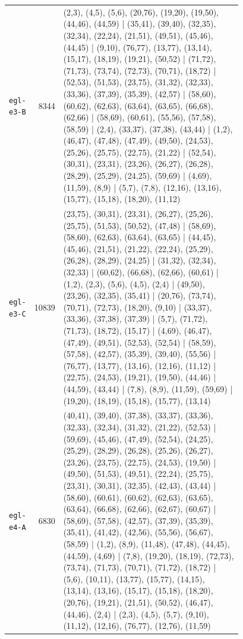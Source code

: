 \begin{landscape}
\begin{longtable}{lr>{\tiny\raggedright\arraybackslash}p{0.78\linewidth}}
\texttt{egl-e3-B} & 8344 & (2,3), (4,5), (5,6), (20,76), (19,20), (19,50), (44,46), (44,59) | (35,41), (39,40), (32,35), (32,34), (22,24), (21,51), (49,51), (45,46), (44,45) | (9,10), (76,77), (13,77), (13,14), (15,17), (18,19), (19,21), (50,52) | (71,72), (71,73), (73,74), (72,73), (70,71), (18,72) | (52,53), (51,53), (23,75), (31,32), (32,33), (33,36), (37,39), (35,39), (42,57) | (58,60), (60,62), (62,63), (63,64), (63,65), (66,68), (62,66) | (58,69), (60,61), (55,56), (57,58), (58,59) | (2,4), (33,37), (37,38), (43,44) | (1,2), (46,47), (47,48), (47,49), (49,50), (24,53), (25,26), (25,75), (22,75), (21,22) | (52,54), (30,31), (23,31), (23,26), (26,27), (26,28), (28,29), (25,29), (24,25), (59,69) | (4,69), (11,59), (8,9) | (5,7), (7,8), (12,16), (13,16), (15,77), (15,18), (18,20), (11,12) \\[2pt]
\texttt{egl-e3-C} & 10839 & (23,75), (30,31), (23,31), (26,27), (25,26), (25,75), (51,53), (50,52), (47,48) | (58,69), (58,60), (62,63), (63,64), (63,65) | (44,45), (45,46), (21,51), (21,22), (22,24), (25,29), (26,28), (28,29), (24,25) | (31,32), (32,34), (32,33) | (60,62), (66,68), (62,66), (60,61) | (1,2), (2,3), (5,6), (4,5), (2,4) | (49,50), (23,26), (32,35), (35,41) | (20,76), (73,74), (70,71), (72,73), (18,20), (9,10) | (33,37), (33,36), (37,38), (37,39) | (5,7), (71,72), (71,73), (18,72), (15,17) | (4,69), (46,47), (47,49), (49,51), (52,53), (52,54) | (58,59), (57,58), (42,57), (35,39), (39,40), (55,56) | (76,77), (13,77), (13,16), (12,16), (11,12) | (22,75), (24,53), (19,21), (19,50), (44,46) | (44,59), (43,44) | (7,8), (8,9), (11,59), (59,69) | (19,20), (18,19), (15,18), (15,77), (13,14) \\[2pt]
\texttt{egl-e4-A} & 6830 & (40,41), (39,40), (37,38), (33,37), (33,36), (32,33), (32,34), (31,32), (21,22), (52,53) | (59,69), (45,46), (47,49), (52,54), (24,25), (25,29), (28,29), (26,28), (25,26), (26,27), (23,26), (23,75), (22,75), (24,53), (19,50) | (49,50), (51,53), (49,51), (22,24), (25,75), (23,31), (30,31), (32,35), (42,43), (43,44) | (58,60), (60,61), (60,62), (62,63), (63,65), (63,64), (66,68), (62,66), (62,67), (60,67) | (58,69), (57,58), (42,57), (37,39), (35,39), (35,41), (41,42), (42,56), (55,56), (56,67), (58,59) | (1,2), (8,9), (11,48), (47,48), (44,45), (44,59), (4,69) | (7,8), (19,20), (18,19), (72,73), (73,74), (71,73), (70,71), (71,72), (18,72) | (5,6), (10,11), (13,77), (15,77), (14,15), (13,14), (13,16), (15,17), (15,18), (18,20), (20,76), (19,21), (21,51), (50,52), (46,47), (44,46), (2,4) | (2,3), (4,5), (5,7), (9,10), (11,12), (12,16), (76,77), (12,76), (11,59) \\[2pt]

\end{longtable}
\end{landscape}
